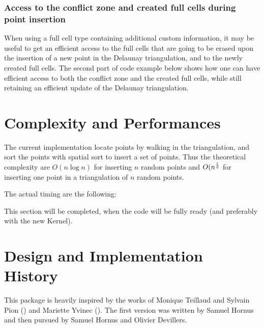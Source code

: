 \subsubsection{Access to the conflict zone and created full cells during point
insertion}

When using a full cell type containing additional custom information, it may be
useful to get an efficient access to the full cells that are going to be erased
upon the insertion of a new point in the Delaunay triangulation, and to the newly
created full cells. The second part of code example below shows how one can have efficient
access to both the conflict zone and the created full cells, while still
retaining an efficient update of the Delaunay triangulation.



\section{Complexity and Performances}

The current implementation locate points by walking in the
triangulation, and sort the points with spatial sort to insert a
set of points. Thus the theoretical complexity are
$O(n\log n)$ for inserting $n$ random points and $O(n^{\frac{1}{d}}$
for inserting one point in a triangulation of $n$ random points.

The actual timing are the following:



This section will be completed, when the code will be fully ready (and
preferably with the new Kernel).


\section{Design and Implementation History}

This package is heavily inspired by the works of
 Monique Teillaud and Sylvain Pion ()
and Mariette Yvinec ().
The first version was written by Samuel Hornus and then
pursued by Samuel Hornus and Olivier Devillers.
